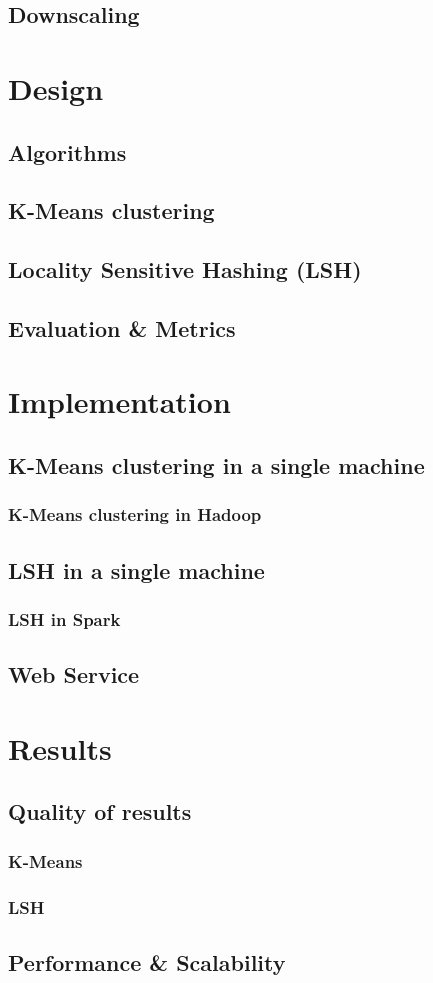 \documentclass[11pt,a4paper,twoside]{scrartcl}
\begin{document}
    \subsection{Downscaling}
  \section{Design}
    \subsection{Algorithms}
      \subsection{K-Means clustering}
      \subsection{Locality Sensitive Hashing (LSH)}
    \subsection{Evaluation \& Metrics}
  \section{Implementation}
    \subsection{K-Means clustering in a single machine}
      \subsubsection{K-Means clustering in Hadoop}
    \subsection{LSH in a single machine}
      \subsubsection{LSH in Spark}
    \subsection{Web Service}
  \section{Results}
    \subsection{Quality of results}
      \subsubsection{K-Means}
      \subsubsection{LSH}
    \subsection{Performance \& Scalability}
  
\end{document}
